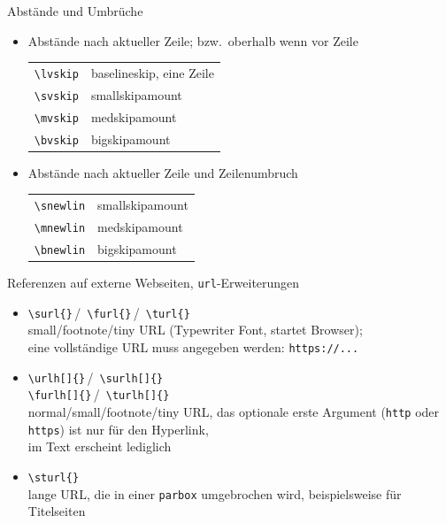 \documentclass[usepdftitle=false, t]{beamer}
\begin{document}
\begin{frame}
\vfill
  Abstände und Umbrüche
  \begin{itemize}
  \item Abstände nach aktueller Zeile; bzw.~oberhalb wenn vor Zeile
    \begin{tabular}[t]{@{}p{20mm}l}
	\verb+\lvskip+	& baselineskip, eine Zeile\\
	\verb+\svskip+	& smallskipamount\\
	\verb+\mvskip+	& medskipamount\\
	\verb+\bvskip+	& bigskipamount
    \end{tabular}
  \item Abstände nach aktueller Zeile und Zeilenumbruch
    \begin{tabular}[t]{@{}p{20mm}l}
	\verb+\snewlin+	& smallskipamount\\
	\verb+\mnewlin+	& medskipamount\\
	\verb+\bnewlin+	& bigskipamount
    \end{tabular}
  \end{itemize}
\framebreak
  Referenzen auf externe Webseiten, \texttt{url}-Erweiterungen
  \begin{itemize}
  \item \verb+\surl{+\verb+}+\,/\,%
	\verb+\furl{+\verb+}+\,/\,%
	\verb+\turl{+\verb+}+\\
	small/footnote/tiny URL (Typewriter Font, startet Browser);\\
	eine vollständige URL muss angegeben werden: \verb+https://...+
  \item \verb+\urlh[+\verb+]{+\verb+}+\,/\,%
	\verb+\surlh[+\verb+]{+\verb+}+\\%
	\verb+\furlh[+\verb+]{+\verb+}+\,/\,%
	\verb+\turlh[+\verb+]{+\verb+}+\\%
	normal/small/footnote/tiny URL, das optionale erste Argument
	(\texttt{http} oder \texttt{https}) ist nur für den Hyperlink,\\
	im Text erscheint lediglich 
  \item \verb+\sturl{+\verb+}+\\
	lange URL, die in einer \texttt{parbox} umgebrochen wird,
	beispielsweise für Titelseiten
  \end{itemize}


\end{frame}
\end{document}

